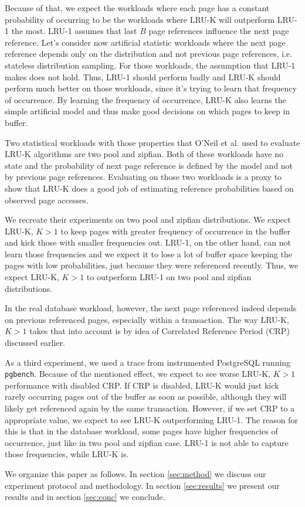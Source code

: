 Because of that, we expect the workloads where each page has a constant probability of occurring to be the workloads where LRU-K will outperform LRU-1 the most. LRU-1 assumes that last $B$ page references influence the next page reference. Let's consider now artificial statistic workloads where the next page reference depends only on the distribution and not previous page references, i.e. stateless distribution sampling. For those workloads, the assumption that LRU-1 makes does not hold. Thus, LRU-1 should perform badly and LRU-K should perform much better on those workloads, since it's trying to learn that frequency of occurrence. By learning the frequency of occurrence, LRU-K also learns the simple artificial model and thus make good decisions on which pages to keep in buffer.

Two statistical workloads with those properties that O'Neil et al. used to evaluate LRU-K algorithms are two pool and zipfian. Both of these workloads have no state and the probability of next page reference is defined by the model and not by previous page references. Evaluating on those two workloads is a proxy to show that LRU-K does a good job of estimating reference probabilities based on observed page accesses.

We recreate their experiments on two pool and zipfian distributions. We expect LRU-K, $K > 1$ to keep pages with greater frequency of occurrence in the buffer and kick those with smaller frequencies out. LRU-1, on the other hand, can not learn those frequencies and we expect it to lose a lot of buffer space keeping the pages with low probabilities, just because they were referenced recently. Thus, we expect LRU-K, $K > 1$ to outperform LRU-1 on two pool and zipfian distributions.

In the real database workload, however, the next page referenced indeed depends on previous referenced pages, especially within a transaction. The way LRU-K, $K > 1$ takes that into account is by idea of Correlated Reference Period (CRP) discussed earlier.

As a third experiment, we used a trace from instrumented PostgreSQL running \texttt{pgbench}. Because of the mentioned effect, we expect to see worse LRU-K, $K > 1$ performance with disabled CRP. If CRP is disabled, LRU-K would just kick rarely occurring pages out of the buffer as soon as possible, although they will likely get referenced again by the same transaction. However, if we set CRP to a appropriate value, we expect to see LRU-K outperforming LRU-1. The reason for this is that in the database workload, some pages have higher frequencies of occurrence, just like in two pool and zipfian case. LRU-1 is not able to capture those frequencies, while LRU-K is.

We organize this paper as follows. In section \ref{sec:method} we discuss our experiment protocol and methodology. In section \ref{sec:results} we present our results and in section \ref{sec:conc} we conclude.